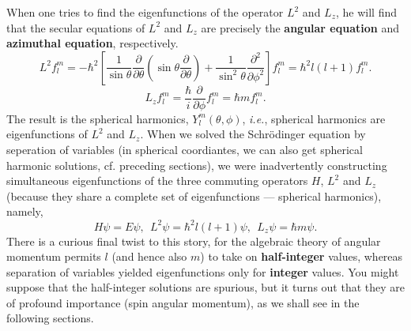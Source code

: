 \documentclass[12pt, 
]{article}
\begin{document}
\noindent When one tries to find the eigenfunctions of the operator $L^2$ and $L_z$, he will find that the secular equations of $L^2$ and $L_z$ are precisely the {\bf angular equation} and {\bf azimuthal equation}, respectively.
\[
	L^2f_l^m=-\hbar^2\left[\frac{1}{\sin\theta}\frac{\partial}{\partial\theta}\left(\sin\theta\frac{\partial}{\partial\theta}\right)+\frac{1}{\sin^2\theta}\frac{\partial^2}{\partial\phi^2}\right]f_l^m=\hbar^2l(l+1)f_l^m.
\]
\[
	L_zf_l^m=\frac{\hbar}{i}\frac{\partial}{\partial\phi}f_l^m=\hbar mf_l^m.
\]
The result is the spherical harmonics, $Y_l^m(\theta,\phi)$, {\it i.e.}, spherical harmonics are eigenfunctions of $L^2$ and $L_z$. When we solved the Schr\"odinger equation by seperation of variables (in spherical coordiantes, we can also get spherical harmonic solutions, cf. preceding sections), we were inadvertently constructing simultaneous eigenfunctions of the three commuting operators $H$, $L^2$ and $L_z$ (because they share a complete set of eigenfunctions --- spherical harmonics), namely,
\[
	H\psi=E\psi,~~L^2\psi=\hbar^2l(l+1)\psi,~~L_z\psi=\hbar m\psi.
\]
There is a curious final twist to this story, for the algebraic theory of angular momentum permits $l$ (and hence also $m$) to take on {\bf half-integer} values, whereas separation of variables yielded eigenfunctions only for {\bf integer} values. You might suppose that the half-integer solutions are spurious, but it turns out that they are of profound importance (spin angular momentum), as we shall see in the following sections.
\end{document}
